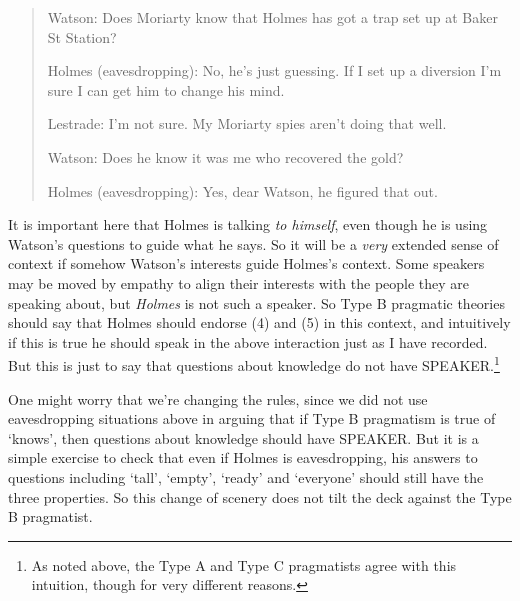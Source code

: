 \begin{quote}
Watson: Does Moriarty know that Holmes has got a trap set up at Baker St Station?

Holmes (eavesdropping): No, he's just guessing. If I set up a diversion I'm sure I can get him to change his mind.

Lestrade: I'm not sure. My Moriarty spies aren't doing that well.

Watson: Does he know it was me who recovered the gold?

Holmes (eavesdropping): Yes, dear Watson, he figured that out.
\end{quote}

It is important here that Holmes is talking \textit{to himself}, even though he is using Watson's questions to guide what he says. So it will be a \textit{very} extended sense of context if somehow Watson's interests guide Holmes's context. Some speakers may be moved by empathy to align their interests with the people they are speaking about, but \textit{Holmes} is not such a speaker. So Type B pragmatic theories should say that Holmes should endorse (4) and (5) in this context, and intuitively if this is true he should speak in the above interaction just as I have recorded. But this is just to say that questions about knowledge do not have SPEAKER.\footnote{As noted above, the Type A and Type C pragmatists agree with this intuition, though for very different reasons.}

One might worry that we're changing the rules, since we did not use eavesdropping situations above in arguing that if Type B pragmatism is true of `knows', then questions about knowledge should have SPEAKER. But it is a simple exercise to check that even if Holmes is eavesdropping, his answers to questions including `tall', `empty', `ready' and `everyone' should still have the three properties. So this change of scenery does not tilt the deck against the Type B pragmatist.

